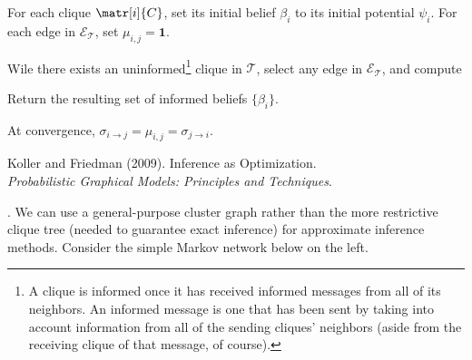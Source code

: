\documentclass[11pt]{article}
\newcommand\p{\Needspace{10\baselineskip} \noindent}
\begin{document}
\begin{compactenum}
	\item For each clique $\matr[i]{C}$, set its initial belief $\beta_i$ to its initial potential $\psi_i$. For each edge in $\mathcal{E}_{\mathcal T}$, set $\mu_{i,j} = \mathbf{1}$.
	
	\item Wile there exists an uninformed\footnote{A clique is informed once it has received informed messages from all of its neighbors. An informed message is one that has been sent by taking into account information from all of the sending cliques' neighbors (aside from the receiving clique of that message, of course).} clique in $\mathcal T$, select any edge in $\mathcal{E}_{\mathcal T}$, and compute
	
	\item Return the resulting set of informed beliefs $\{ \beta_i \}$. 
\end{compactenum}
At convergence, $\sigma_{i \rightarrow j} = \mu_{i,j} = \sigma_{j \rightarrow i}$. 









\vspace{-1.7em}
{\scriptsize Koller and Friedman (2009). Inference as Optimization.\\ \textit{Probabilistic Graphical Models: Principles and Techniques}.\\ }

\p {}. We can use a general-purpose cluster graph rather than the more restrictive clique tree (needed to guarantee exact inference) for approximate inference methods. Consider the simple Markov network below on the left.
\end{document}
